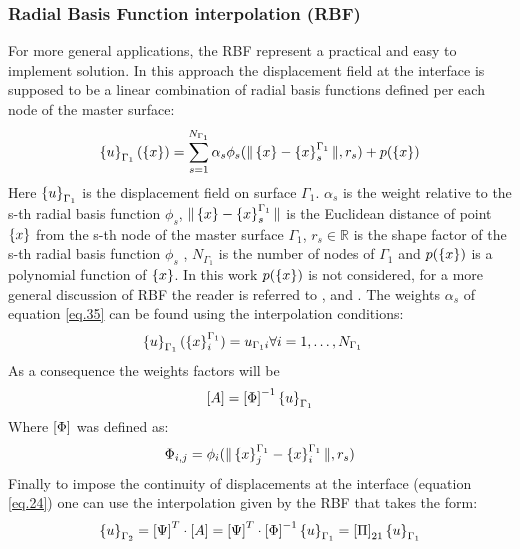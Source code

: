      \subsubsection{Radial Basis Function interpolation (RBF)}\label{sssec332}
     For more general applications, the RBF represent a practical and easy to implement solution. In this approach the displacement field at the interface  is supposed to be a linear combination of radial basis functions defined per each node of the master surface:
     \begin{equation}
     \label{eq.35}
     \left\lbrace{u}\right \rbrace_{\Gamma_1}(\left\lbrace{x}\right \rbrace)=\sum_{s=1}^{N_{\Gamma_1}}\alpha_s\phi_s(\|\left\lbrace{x}\right \rbrace-\left\lbrace{x}\right \rbrace^{\Gamma_1}_s\|,r_s)+p(\left\lbrace{x}\right \rbrace)
     \end{equation}
     Here $\left\lbrace{u}\right \rbrace_{\Gamma_1}$ is the displacement field on surface $\Gamma_1$. $\alpha_s$ is the weight relative to the s-th radial basis function $\phi_s$, $\|\left\lbrace{x}\right \rbrace-\left\lbrace{x}\right \rbrace^{\Gamma_1}_s\| $ is the Euclidean distance of point $\left\lbrace{x}\right \rbrace$ from the s-th node of the master surface $\Gamma_1$, $r_s \in \mathbb{R} $ is the shape factor of the s-th radial basis function $\phi_s$ , $N_{\Gamma_1}$ is the number of nodes of $\Gamma_1$ and $p(\left\lbrace{x}\right \rbrace)$ is a polynomial function of $\left\lbrace{x}\right \rbrace$. In this work $p(\left\lbrace{x}\right \rbrace)$ is not considered, for a more general discussion of RBF the reader is referred to \cite{de2007review} , \cite{beckert2001multivariate} and \cite{smith2000evaluation}. The weights $\alpha_s$ of equation \eqref{eq.35} can be found using the interpolation conditions:
     \begin{eqnarray}
     \label{eq.36}
     \left\lbrace{u}\right \rbrace_{\Gamma_1}(\left\lbrace{x}\right \rbrace_i^{\Gamma_1})=u_{\Gamma_1 i} & \forall i=1,\dots,N_{\Gamma_1} 
     \end{eqnarray}
     As a consequence the weights factors will be
     \begin{equation}
     \label{eq.37}
     \left[{A}\right]=\left[{\Phi}\right]^{-1}\left\lbrace{u}\right \rbrace_{\Gamma_1}
     \end{equation}
     Where $\left[{\Phi}\right]$ was defined as:
     \begin{equation}
     \label{eq.38}
     \Phi_{i,j}=\phi_i(\|\left\lbrace{x}\right \rbrace^{\Gamma_1}_j-\left\lbrace{x}\right \rbrace^{\Gamma_1}_i\|,r_s)
     \end{equation}
     Finally to impose the continuity of displacements at the interface (equation \eqref{eq.24}) one can use the interpolation given by the RBF that takes the form:
     \begin{equation}
     \label{eq.39}
     \left\lbrace{u}\right \rbrace_{\Gamma_2}=\left[{\Psi}\right]^T\cdot\left[{A}\right]=\left[{\Psi}\right]^T\cdot\left[{\Phi}\right]^{-1}\left\lbrace{u}\right \rbrace_{\Gamma_1}=\left[{\Pi}\right]_{21}\left\lbrace{u}\right \rbrace_{\Gamma_1}
     \end{equation}
